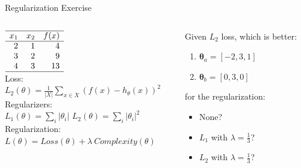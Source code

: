 \documentclass[14pt]{beamer}
\begin{document}
\begin{frame}[label=regularization-exercise]{Regularization Exercise}
\begin{columns}[T]
\begin{column}{0.49\textwidth}
{\centering
$\begin{array}{ r r r }
\hline
x_1 & x_2 & f(x) \\
\hline
2 & 1 & 4 \\
3 & 2 & 9 \\
4 & 3 & 13 \\
\hline
\end{array}$\\}
\bigskip
\bigskip
Loss:\\
{\small$\displaystyle L_2(\theta) = \frac{1}{|X|} \sum_{x \in X} \left( f(x) - h_{\theta}(x) \right)^2$}\\
Regularizers:\\
{\small$\displaystyle L_1(\theta) = \sum_{i} | \theta_{i} |$ \hfill $\displaystyle L_2(\theta) = \sum_{i} | \theta_{i} |^{2}$}\\
Regularization:\\
{\small$\displaystyle L(\theta) = Loss(\theta) + \lambda \: Complexity(\theta)$}\\
\end{column}
\begin{column}{0.55\textwidth}
\setlength{\leftmargini}{1.25em}
Given $L_2$ loss, which is better:
\begin{enumerate}
\item $\bm{\theta}_{a} = [-2, 3, 1]$
\item $\bm{\theta}_{b} = [0, 3, 0]$
\end{enumerate}
for the regularization:
\begin{itemize}
\item None?
\item $L_1$ with $\lambda=\frac{1}{3}$?
\item $L_2$ with $\lambda=\frac{1}{3}$?

\end{itemize}
\end{column}
\end{columns}
\end{frame}
\end{document}
